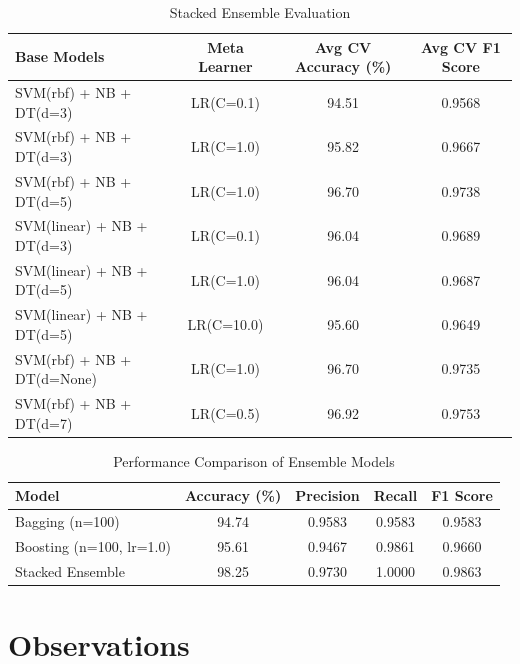 \documentclass[11pt]{article}
\begin{document}
\begin{table}[H]
\centering
\renewcommand{\arraystretch}{1.3}
\caption{Stacked Ensemble Evaluation}
\begin{tabular}{|l|c|c|c|}
\hline
Base Models & Meta Learner & Avg CV Accuracy (\%) & Avg CV F1 Score \\
\hline
SVM(rbf) + NB + DT(d=3) & LR(C=0.1) & 94.51 & 0.9568 \\
SVM(rbf) + NB + DT(d=3) & LR(C=1.0) & 95.82 & 0.9667 \\
SVM(rbf) + NB + DT(d=5) & LR(C=1.0) & 96.70 & 0.9738 \\
SVM(linear) + NB + DT(d=3) & LR(C=0.1) & 96.04 & 0.9689 \\
SVM(linear) + NB + DT(d=5) & LR(C=1.0) & 96.04 & 0.9687 \\ 
SVM(linear) + NB + DT(d=5) & LR(C=10.0) & 95.60 & 0.9649 \\
SVM(rbf) + NB + DT(d=None) & LR(C=1.0) & 96.70 & 0.9735 \\
SVM(rbf) + NB + DT(d=7) & LR(C=0.5) & 96.92 & 0.9753 \\
 \hline
\end{tabular}
\end{table}

\begin{table}[H]
\centering
\renewcommand{\arraystretch}{1.3}
\caption{Performance Comparison of Ensemble Models}
\begin{tabular}{|l|c|c|c|c|}
\hline
Model & Accuracy (\%) & Precision & Recall & F1 Score \\
\hline
Bagging (n=100) & 94.74 & 0.9583 & 0.9583 & 0.9583 \\
Boosting (n=100, lr=1.0) & 95.61 & 0.9467 & 0.9861 & 0.9660 \\
Stacked Ensemble & 98.25 & 0.9730 & 1.0000 & 0.9863 \\
 \hline
\end{tabular}
\end{table}

\section{Observations}
\end{document}
